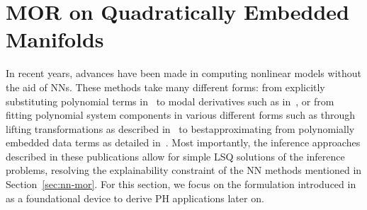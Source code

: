 \section{MOR on Quadratically Embedded Manifolds}\label{sec:mor-quadratically-embedded-manifolds}

In recent years, advances have been made in computing nonlinear models without the aid of \acp{NN}.
These methods take many different forms: from explicitly substituting polynomial terms in~\cite{Gu2011} to modal derivatives such as in~\cite{Wu2016, Weeger2016, Jain2017, Rutzmoser2017}, or from fitting polynomial system components in various different forms such as through lifting transformations as described in~\cite{Kramer2019, Qian2022} to bestapproximating from polynomially embedded data terms as detailed in~\cite{Peherstorfer2016, BGK2020, Gosea2021, Barnett2022, Geelen2023}.
Most importantly, the inference approaches described in these publications allow for simple \ac{LSQ} solutions of the inference problems, resolving the explainability constraint of the \ac{NN} methods mentioned in Section~\ref{sec:nn-mor}.
For this section, we focus on the formulation introduced in~\cite{Geelen2023} as a foundational device to derive \ac{PH} applications later on.

